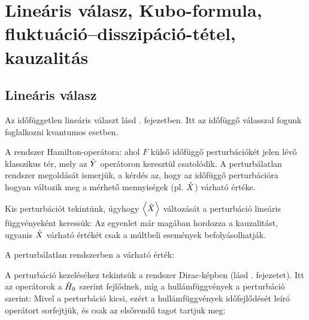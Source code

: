 \chapter{Line\'aris v\'alasz, Kubo-formula, fluktu\'aci\'o--disszip\'aci\'o-t\'etel, kauzalit\'as} 
 
 \section{Lineáris válasz}
  
  Az időfüggetlen lineáris választ lásd . fejezetben. Itt az időfüggő válasszal fogunk foglalkozni kvantumos esetben.
  
  A rendszer Hamilton-operátora:
  ahol $F$ külső időfüggő perturbációkét jelen lévő klasszikus tér, mely az $\hat{Y}$ operátoron keresztül csatolódik. A perturbálatlan rendszer megoldását ismerjük, a kérdés az, hogy az időfüggő perturbációra hogyan változik meg a mérhető mennyiségek (pl. $\hat{X}$) várható értéke. 
  
  Kis perturbációt tekintünk, úgyhogy $\left\langle\hat{X}\right\rangle$ változását a perturbáció lineáris függvényeként keressük:
  Az egyenlet már magában hordozza a kauzalitást, ugyanis $\hat{X}$ várható értékét csak a múltbeli események befolyásolhatják. 
  
  A perturbálatlan rendszerben a várható érték:
  
  A perturbáció kezeléséhez tekintsük a rendszer Dirac-képben (lásd . fejezetet). Itt az operátorok a $\hat{H}_0$ szerint fejlődnek, míg a hullámfüggvények a perturbáció szerint:
  Mivel a perturbáció kicsi, ezért a hullámfüggvények időfejlődését leíró operátort sorfejtjük, és csak az elsőrendű tagot tartjuk meg:


